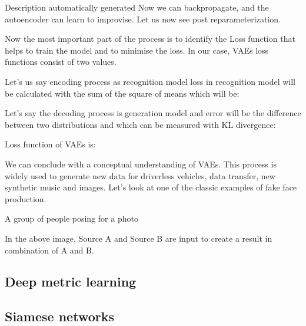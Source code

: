 Description automatically generated
Now we can backpropagate, and the autoencoder can learn to improvise. Let us now see post reparameterization.


Now the most important part of the process is to identify the Loss function that helps to train the model and to minimise the loss. In our case, VAEs loss functions consist of two values.

Let’s us say encoding process as recognition model loss in recognition model will be calculated with the sum of the square of means which will be:


Let’s say the decoding process is generation model and error will be the difference between two distributions and which can be measured with KL divergence: 


Loss function of VAEs is:


We can conclude with a conceptual understanding of VAEs. This process is widely used to generate new data for driverless vehicles, data transfer, new synthetic music and images.  Let’s look at one of the classic examples of fake face production. 

A group of people posing for a photo

In the above image, Source A and Source B are input to create a result in combination of A and B. 

\subsection{Deep metric learning}

\subsection{Siamese networks}
